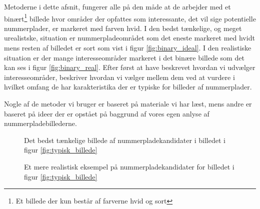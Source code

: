 Metoderne i dette afsnit, fungerer alle på den måde at de arbejder med et binært\footnote{Et billede der kun består af farverne hvid og sort} billede hvor områder der opfattes som interessante, det vil sige potentielle nummerplader, er markeret med farven hvid. I den bedst tænkelige, og meget urealistske, situation er nummerpladeområdet som det eneste markeret med hvidt mens resten af billedet er sort som vist i figur \vref{fig:binary_ideal}. I den realistiske situation er der mange interesseområder markeret i det binære billede som det kan ses i figur \vref{fig:binary_real}. Efter først at have beskrevet hvordan vi udvælger interesseområder, beskriver hvordan vi vælger mellem dem ved at vurdere i hvilket omfang de har karakteristika der er typiske for billeder af nummerplader. 

Nogle af de metoder vi bruger er baseret på materiale vi har læst, mens andre er baseret på ideer der er opstået på baggrund af vores egen anlyse af nummerpladebillederne.


\begin{figure}[htbp]
  \centering
  \begin{minipage}[b]{5 cm}
    \caption{Det bedst tænkelige billede af nummerpladekandidater i billedet i figur \ref{fig:typisk_billede}}
    \label{fig:binary_ideal} 
  \end{minipage}
  \begin{minipage}[b]{5 cm}
  \caption{Et mere realistisk eksempel på nummerpladekandidater for billedet i figur \ref{fig:typisk_billede}}
  \label{fig:binary_real} 
  \end{minipage}
\end{figure}

